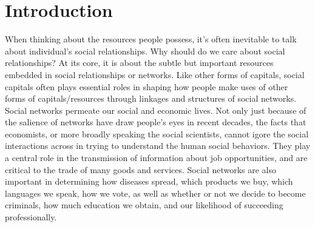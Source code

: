 \documentclass{article}
\begin{document}


\tableofcontents

\setcounter{pnumb}{\value{page}}       	%
\setcounter{page}{\value{pnumb}}       	%
\newpage
\section{Introduction}



When thinking about the resources people possess, it's often inevitable to talk about individual's social relationships.  Why should do we care about social relationships? At its core, it is about the subtle but important resources embedded in social relationships or networks. Like other forms of capitals, social capitals often plays essential roles in shaping how people make uses of other forms of capitals/resources through linkages and structures of social networks. Social networks permeate our social and economic lives. Not only just because of the salience of networks have draw people's eyes in recent decades, the facts that economists, or more broadly speaking the social scientists, cannot igore the social interactions across in trying to understand the human social behaviors. They play a central role in the transmission of information about job opportunities, and are critical to the trade of many goods and services. Social networks are also important in determining how diseases spread, which products we buy, which languages we speak, how we vote, as well as whether or not we decide to become criminals, how much education we obtain, and our likelihood of succeeding professionally.
\end{document}
